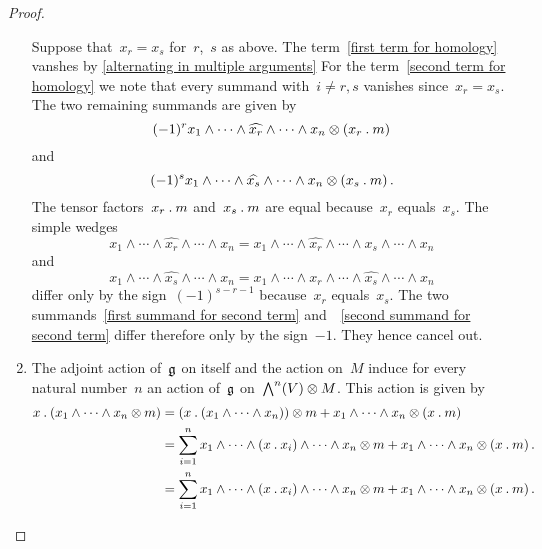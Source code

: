 \begin{proof}
\begin{enumerate}
      Suppose that~$x_r = x_s$ for~$r$,~$s$ as above.
      The term~\eqref{first term for homology} vanshes by \cref{alternating in multiple arguments}
      For the term~\eqref{second term for homology} we note that every summand with~$i \neq r, s$ vanishes since~$x_r = x_s$.
      The two remaining summands are given by
      \begin{equation}
        \label{first summand for second term}
        (-1)^r x_1 \wedge \dotsb \wedge \widehat{x_r} \wedge \dotsb \wedge x_n \otimes (x_r \mathbin{.} m)
      \end{equation}
      and
      \begin{equation}
        \label{second summand for second term}
        (-1)^s x_1 \wedge \dotsb \wedge \widehat{x_s} \wedge \dotsb \wedge x_n \otimes (x_s \mathbin{.} m) \,.
      \end{equation}
      The tensor factors~$x_r \mathbin{.} m$ and~$x_s \mathbin{.} m$ are equal because~$x_r$ equals~$x_s$.
      The simple wedges
      \[
        x_1 \wedge \dotsb \wedge \widehat{x_r} \wedge \dotsb \wedge x_n
        =
        x_1 \wedge \dotsb \wedge \widehat{x_r} \wedge \dotsb \wedge x_s \wedge \dotsb \wedge x_n
      \]
      and
      \[
        x_1 \wedge \dotsb \wedge \widehat{x_s} \wedge \dotsb \wedge x_n
        =
        x_1 \wedge \dotsb \wedge x_r \wedge \dotsb \wedge \widehat{x_s} \wedge \dotsb \wedge x_n
      \]
      differ only by the sign~$(-1)^{s-r-1}$ because~$x_r$ equals~$x_s$.
      The two summands~\eqref{first summand for second term} and~~\eqref{second summand for second term} differ therefore only by the sign~$-1$.
      They hence cancel out.
    \item
      The adjoint action of~$\mathfrak{g}$ on itself and the action on~$M$ induce for every natural number~$n$ an action of~$\mathfrak{g}$ on~$\operatorname{\bigwedge}^n(V) \otimes M$.
      This action is given by
      \begin{align*}
        x \mathbin{.} (x_1 \wedge \dotsb \wedge x_n \otimes m)
        &=
        (x \mathbin{.} (x_1 \wedge \dotsb \wedge x_n)) \otimes m
        + x_1 \wedge \dotsb \wedge x_n \otimes (x \mathbin{.} m)
        \\
        &=
        \sum_{i=1}^n x_1 \wedge \dotsb \wedge (x \mathbin{.} x_i) \wedge \dotsb \wedge x_n \otimes m
        + x_1 \wedge \dotsb \wedge x_n \otimes (x \mathbin{.} m) \,.
        \\
        &=
        \sum_{i=1}^n x_1 \wedge \dotsb \wedge (x \mathbin{.} x_i) \wedge \dotsb \wedge x_n \otimes m
        + x_1 \wedge \dotsb \wedge x_n \otimes (x \mathbin{.} m) \,.
      \end{align*}


\end{enumerate}
\end{proof}
